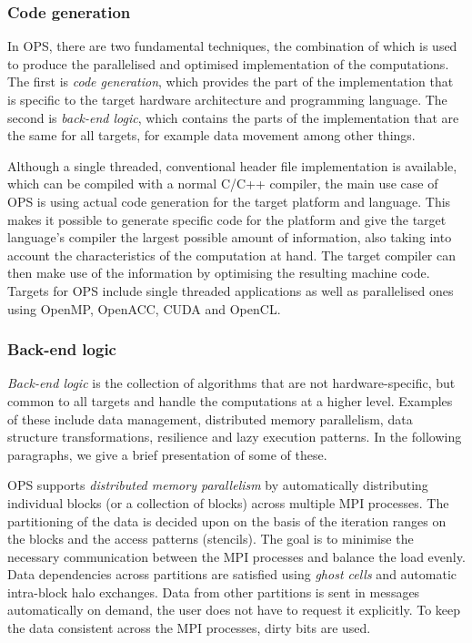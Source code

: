 \documentclass[fontsize=11pt, appendixprefix=true]{scrreprt}
\begin{document}
\subsubsection{Code generation}

In OPS, there are two fundamental techniques, the combination of which is used
to produce the parallelised and optimised implementation of the
computations. The first is \textit{code generation}, which provides the part of
the implementation that is specific to the target hardware architecture and
programming language. The second is \textit{back-end logic}, which contains the
parts of the implementation that are the same for all targets, for example data
movement among other things.

Although a single threaded, conventional header file implementation is
available, which can be compiled with a normal C/C++ compiler, the main use case
of OPS is using actual code generation for the target platform and
language. This makes it possible to generate specific code for the platform and
give the target language's compiler the largest possible amount of information,
also taking into account the characteristics of the computation at hand. The
target compiler can then make use of the information by optimising the resulting
machine code. Targets for OPS include single threaded applications as well as
parallelised ones using OpenMP, OpenACC, CUDA and OpenCL.

\subsubsection{Back-end logic}

\textit{Back-end logic} is the collection of algorithms that are not
hardware-specific, but common to all targets and handle the computations at a
higher level. Examples of these include data management, distributed memory
parallelism, data structure transformations, resilience and lazy execution
patterns. In the following paragraphs, we give a brief presentation of some of
these.

OPS supports \textit{distributed memory parallelism} by automatically
distributing individual blocks (or a collection of blocks) across multiple MPI
processes. The partitioning of the data is decided upon on the basis of the
iteration ranges on the blocks and the access patterns (stencils). The goal is
to minimise the necessary communication between the MPI processes and balance
the load evenly.  Data dependencies across partitions are satisfied using
\textit{ghost cells} and automatic intra-block halo exchanges. Data from other
partitions is sent in messages automatically on demand, the user does not have
to request it explicitly. To keep the data consistent across the MPI processes,
dirty bits are used.
\end{document}
